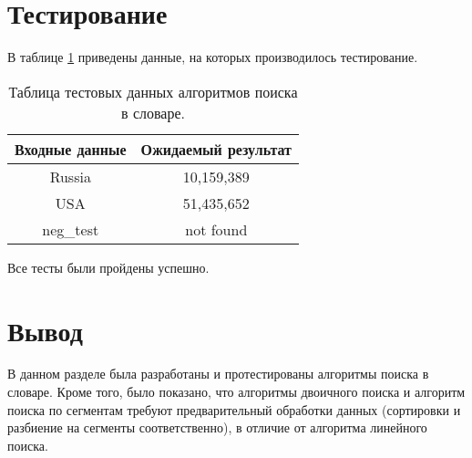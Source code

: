 \section{Тестирование}

В таблице \ref{test_table} приведены данные, на которых производилось тестирование.

\begin{table}[H]
	\caption{Таблица тестовых данных алгоритмов поиска в словаре.}
	\label{test_table}
	\begin{center}
		
		\begin{tabular}{|c c|} 
			
			\hline
			
			Входные данные & Ожидаемый результат\\  
			
			\hline
			
			Russia & 10,159,389 \\
			
			\hline
			
			USA & 51,435,652 \\
			
			\hline
			
			neg\_test & not found \\
			
			\hline
			
		\end{tabular}
		
	\end{center}
	
\end{table}

Все тесты были пройдены успешно.

\section*{Вывод}

В данном разделе была разработаны и протестированы алгоритмы поиска в словаре. Кроме того, было показано, что алгоритмы двоичного поиска и алгоритм поиска по сегментам требуют предварительный обработки данных (сортировки и разбиение на сегменты соответственно), в отличие от алгоритма линейного поиска.